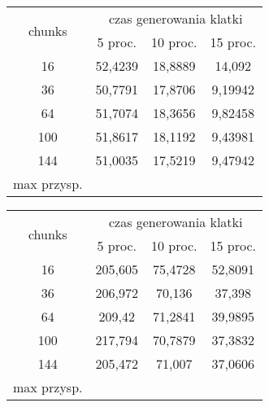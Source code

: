 \begin{figure}[!ht]
\advance\leftskip-2cm
	\begin{subfigure}{.5\textwidth}
\begin{tabular}{|c|c|c|c|} \hline
	    \multirow{2}{*}{chunks} & \multicolumn{3}{|c|}{czas generowania klatki} \\ \cline{2-4}
	 	& 5 proc. & 10 proc. & 15 proc. \\ \hline
	    16 & 52,4239 & 18,8889 & 14,092 \\ 
	    36 & 50,7791 & 17,8706 & 9,19942 \\
		64 & 51,7074 & 18,3656 & 9,82458 \\
		100 & 51,8617 & 18,1192 & 9,43981 \\
		144 & 51,0035 & 17,5219 & 9,47942 \\ \hline
		max przysp. & & & \\
		\hline
\end{tabular}
	\end{subfigure}
	\hspace{2cm}
	\begin{subfigure}{.5\textwidth}
\begin{tabular}{|c|c|c|c|} \hline
	    \multirow{2}{*}{chunks} & \multicolumn{3}{|c|}{czas generowania klatki} \\ \cline{2-4}
	 	& 5 proc. & 10 proc. & 15 proc. \\ \hline
	    16 & 205,605 & 75,4728 & 52,8091 \\ 
	    36 & 206,972 & 70,136 & 37,398 \\
		64 & 209,42 & 71,2841 & 39,9895 \\
		100 & 217,794 & 70,7879 & 37,3832 \\
		144 & 205,472 & 71,007 & 37,0606 \\ \hline
		max przysp. & & & \\
		\hline
\end{tabular}
	\end{subfigure}
\end{figure}
